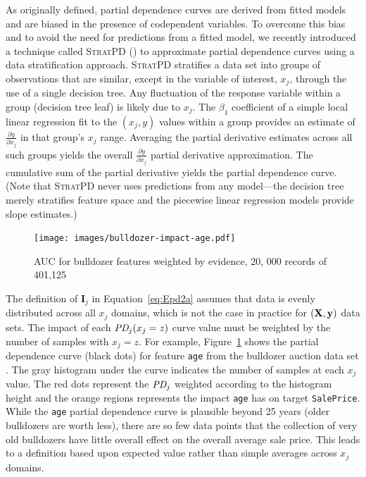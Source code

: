 \documentclass[12pt]{article}
\newcommand{\figref}[1]{Figure~\ref{#1}}
\newcommand{\eqnref}[1]{Equation~\ref{#1}}
\newcommand{\Imp}{\mathbf{I}}
\newcommand{\spd}{\fontfamily{cmr}\textsc{\small StratPD}}
\begin{document}
As originally defined, partial dependence curves are derived from fitted models and are biased in the presence of codependent variables.  To overcome this bias and to avoid the need for predictions from a fitted model, we recently introduced a technique called \spd{} (\cite{stratpd}) to approximate partial dependence curves using a data stratification approach. \spd{} stratifies a data set into groups of observations that are similar, except in the variable of interest, $x_j$, through the use of a single decision tree. Any fluctuation of the response variable within a group (decision tree leaf) is likely due to $x_j$. The $\beta_1$ coefficient of a simple local linear regression fit to the $(x_j, y)$ values within a group provides an estimate of $\frac{\partial y}{\partial x_j}$ in that group's $x_j$ range. Averaging the partial derivative estimates across all such groups yields the overall $\frac{\partial y}{\partial x_j}$ partial derivative approximation. The cumulative sum of the partial derivative yields the partial dependence curve. (Note that \spd{} never uses predictions from any model---the decision tree merely stratifies feature space and the piecewise linear regression models provide slope estimates.)

\begin{figure}[htbp]
\begin{center}
\texttt{[image: images/bulldozer-impact-age.pdf]}\caption{AUC for bulldozer features weighted by evidence, 20, 000 records of 401,125}
\label{fig:bulldozer-impact}
\end{center}
\end{figure}

The definition of $\Imp_j$ in \eqnref{eq:Epd2a} assumes that data is evenly distributed across all $x_j$ domains, which is not the case in practice for $(\bf X, y)$ data sets.  The impact of each $\text{\it PD}_j(x_j=z)$ curve value must be weighted by the number of samples with $x_j=z$.  For example, \figref{fig:bulldozer-impact} shows the partial dependence curve (black dots) for feature {\tt\small age} from the bulldozer auction data set \cite{bulldozer}. The gray histogram under the curve indicates the number of samples at each $x_j$ value. The red dots represent the $\text{\it PD}_j$ weighted according to the histogram height and the orange regions represents the impact {\tt\small age} has on target {\tt\small SalePrice}. While the {\tt\small age} partial dependence curve is plausible beyond 25 years (older bulldozers are worth less), there are so few data points that the collection of very old bulldozers have little overall effect on the overall average sale price.  This leads to a definition based upon expected value rather than simple averages across $x_j$ domains.
\end{document}
